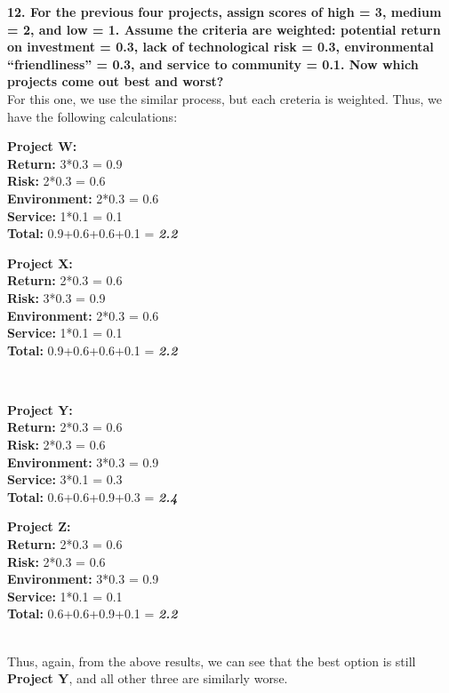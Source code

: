 \documentclass{article}
\begin{document}
    \textbf{12. For the previous four projects, assign scores of high = 3, medium = 2, and low = 1. Assume the criteria are weighted: potential return on investment = 0.3, lack of technological risk = 0.3, environmental “friendliness” = 0.3, and service to community = 0.1. Now which projects come out best and worst?}\\[0.5em]
    For this one, we use the similar process, but each creteria is weighted. Thus, we have the following calculations:\\[0.5em]
    \hspace*{1cm}\begin{minipage}{0.5\textwidth}
        \textbf{Project W:}\\
        \textbf{Return:} 3*0.3 = 0.9\\
        \textbf{Risk:} 2*0.3 = 0.6\\
        \textbf{Environment:} 2*0.3 = 0.6\\
        \textbf{Service:} 1*0.1 = 0.1\\
        \textbf{Total:} 0.9+0.6+0.6+0.1 = \textbf{\textit{2.2}}
    \end{minipage}
    \hfill
    \hspace*{1cm}\begin{minipage}{0.5\textwidth}
        \textbf{Project X:}\\
        \textbf{Return:} 2*0.3 = 0.6\\
        \textbf{Risk:} 3*0.3 = 0.9\\
        \textbf{Environment:} 2*0.3 = 0.6\\
        \textbf{Service:} 1*0.1 = 0.1\\
        \textbf{Total:} 0.9+0.6+0.6+0.1 = \textbf{\textit{2.2}}
    \end{minipage}\\[1em]
    \hspace*{1cm}\begin{minipage}{0.5\textwidth}
        \textbf{Project Y:}\\
        \textbf{Return:} 2*0.3 = 0.6\\
        \textbf{Risk:} 2*0.3 = 0.6\\
        \textbf{Environment:} 3*0.3 = 0.9\\
        \textbf{Service:} 3*0.1 = 0.3\\
        \textbf{Total:} 0.6+0.6+0.9+0.3 = \textbf{\textit{2.4}}
    \end{minipage}
    \hfill
    \hspace*{1cm}\begin{minipage}{0.5\textwidth}
        \textbf{Project Z:}\\
        \textbf{Return:} 2*0.3 = 0.6\\
        \textbf{Risk:} 2*0.3 = 0.6\\
        \textbf{Environment:} 3*0.3 = 0.9\\
        \textbf{Service:} 1*0.1 = 0.1\\
        \textbf{Total:} 0.6+0.6+0.9+0.1 = \textbf{\textit{2.2}}
    \end{minipage}\\[0.5em]
    Thus, again, from the above results, we can see that the best option is still \textbf{Project Y}, and all other three are similarly worse. 
\end{document}
